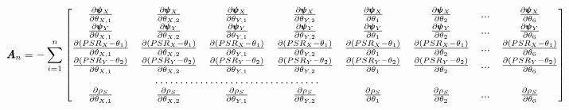 \documentclass[]{article}
\begin{document}
\[
\pmb{A}_n = -\sum_{i = 1}^{n} \begin{bmatrix}
    \frac{\partial \pmb{\psi}_X}{\partial \theta_{X,1}} & \frac{\partial \pmb{\psi}_X}{\partial \theta_{X,2}}  &  \frac{\partial \pmb{\psi}_X}{\partial \theta_{Y,1}}  &  \frac{\partial \pmb{\psi}_X}{\partial \theta_{Y,2}}     &      \frac{\partial \pmb{\psi}_X}{\partial \theta_1}     &     \frac{\partial \pmb{\psi}_X}{\partial \theta_2}     & ...   &     \frac{\partial \pmb{\psi}_X}{\partial \theta_6} \\
   \frac{\partial \pmb{\psi}_Y}{\partial \theta_{X,1}} & \frac{\partial \pmb{\psi}_Y}{\partial \theta_{X,2}}  &  \frac{\partial \pmb{\psi}_Y}{\partial \theta_{Y,1}}  &  \frac{\partial \pmb{\psi}_Y}{\partial \theta_{Y,2}}     &      \frac{\partial \pmb{\psi}_Y}{\partial \theta_1}     &     \frac{\partial \pmb{\psi}_Y}{\partial \theta_2}     &    ...   &     \frac{\partial \pmb{\psi}_Y}{\partial \theta_6} \\
    \frac{\partial (PSR_X - \theta_1)}{\partial \theta_{X,1}} & \frac{\partial (PSR_X - \theta_1)}{\partial \theta_{X,2}}  &  \frac{\partial (PSR_X - \theta_1)}{\partial \theta_{Y,1}}  &  \frac{\partial (PSR_X - \theta_1)}{\partial \theta_{Y,2}}      &      \frac{\partial (PSR_X - \theta_1)}{\partial \theta_1}     &     \frac{\partial (PSR_X - \theta_1)}{\partial \theta_2}     &    ...  &     \frac{\partial (PSR_X - \theta_1)}{\partial \theta_6} \\
   \frac{\partial (PSR_Y - \theta_2)}{\partial \theta_{X,1}} & \frac{\partial (PSR_Y - \theta_2)}{\partial \theta_{X,2}}  &  \frac{\partial (PSR_Y - \theta_2)}{\partial \theta_{Y,1}}  &  \frac{\partial (PSR_Y - \theta_2)}{\partial \theta_{Y,2}}     &      \frac{\partial  (PSR_Y - \theta_2)}{\partial \theta_1}     &     \frac{\partial  (PSR_Y - \theta_2)}{\partial \theta_2}     &     ...   &     \frac{\partial  (PSR_Y - \theta_2)}{\partial \theta_6} \\
  \hdotsfor{5} \\
  \frac{\partial \rho_S}{\partial \theta_{X,1}} & \frac{\partial \rho_S}{\partial \theta_{X,2}}  &  \frac{\partial \rho_S}{\partial \theta_{Y,1}}  &  \frac{\partial \rho_S}{\partial \theta_{Y,2}}     &      \frac{\partial \rho_S}{\partial \theta_1}     &     \frac{\partial \rho_S}{\partial \theta_2}      &     ...    &     \frac{\partial \rho_S}{\partial \theta_6} \\
\end{bmatrix}
\]
\end{document}
